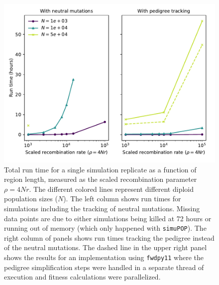 \documentclass{article}
\newcommand{\simupop}{\texttt{simuPOP}}
\newcommand{\fwdpy}{\texttt{fwdpy11}}
\begin{document}
\begin{figure}
    \includegraphics[]{sims/rawspeed}
    \caption{\label{fig:runtimes_selection}Total run time for a single simulation replicate as a function of region
        length, measured as the scaled recombination parameter $\rho = 4Nr$. The different colored lines represent
        different diploid population sizes ($N$). The left column shows run times for
        simulations including the tracking of neutral mutations.  Missing data points are due to either simulations
    being killed at 72 hours or running out of memory (which only happened with \simupop{}).  The right column of
panels shows run times tracking the pedigree instead of the neutral mutations. The dashed line in the upper right panel shows
the results for an implementation using \fwdpy{} where the pedigree simplification steps were handled in a separate thread of
execution and fitness calculations were parallelized.}
\end{figure}
\end{document}
